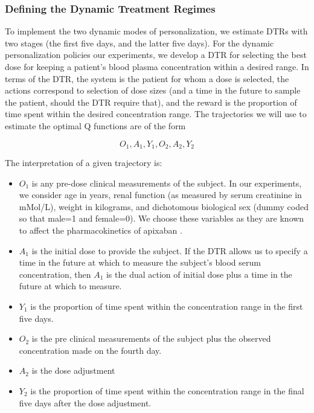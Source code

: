 \subsubsection{Defining the Dynamic Treatment Regimes}

To implement the two dynamic modes of personalization, we estimate DTRs with two stages (the first five days, and the latter five days).  For the dynamic personalization policies our experiments, we develop a DTR for selecting the best dose for keeping a patient’s blood plasma concentration within a desired range.  In terms of the DTR, the system is the patient for whom a dose is selected, the actions correspond to selection of dose sizes (and a time in the future to sample the patient, should the DTR require that), and the reward is the proportion of time spent within the desired concentration range. The trajectories we will use to estimate the optimal Q functions are of the form

\begin{equation}\label{key}
O_1, A_1, Y_1, O_2, A_2, Y_2
\end{equation}

\noindent The interpretation of a given trajectory is:
\begin{itemize}
	\item $ O_1 $ is any pre-dose clinical measurements of the subject.  In our experiments, we consider age in years, renal function (as measured by serum creatinine in mMol/L), weight in kilograms, and dichotomous biological sex (dummy coded so that male=1 and female=0).  We choose these variables as they are known to affect the pharmacokinetics of apixaban \cite{byon2019apixaban}.  
	\item $ A_1 $ is the initial dose to provide the subject.  If the DTR allows us to specify a time in the future at which to measure the subject’s blood serum concentration, then $A_1$ is the dual action of initial dose plus a time in the future at which to measure.
	\item $ Y_1 $ is the proportion of time spent within the concentration range in the first five days.
	\item $ O_2 $ is the pre clinical measurements of the subject plus the observed concentration made on the fourth day.
	\item $ A_2 $ is the dose adjustment
	\item $ Y_2 $ is the proportion of time spent within the concentration range in the final five days after the dose adjustment.
\end{itemize}

